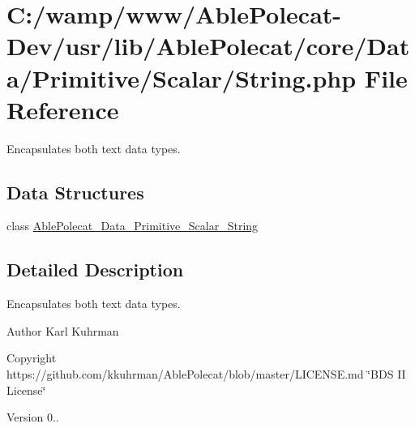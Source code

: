\hypertarget{_string_8php}{}\section{C\+:/wamp/www/\+Able\+Polecat-\/\+Dev/usr/lib/\+Able\+Polecat/core/\+Data/\+Primitive/\+Scalar/\+String.php File Reference}
\label{_string_8php}


Encapsulates both text data types.  


\subsection*{Data Structures}
\begin{DoxyCompactItemize}
\item 
class \hyperlink{class_able_polecat___data___primitive___scalar___string}{Able\+Polecat\+\_\+\+Data\+\_\+\+Primitive\+\_\+\+Scalar\+\_\+\+String}
\end{DoxyCompactItemize}


\subsection{Detailed Description}
Encapsulates both text data types. 

\begin{DoxyAuthor}{Author}
Karl Kuhrman 
\end{DoxyAuthor}
\begin{DoxyCopyright}{Copyright}
https\+://github.com/kkuhrman/\+Able\+Polecat/blob/master/\+L\+I\+C\+E\+N\+S\+E.\+md \char`\"{}\+B\+D\+S I\+I License\char`\"{} 
\end{DoxyCopyright}
\begin{DoxyVersion}{Version}
0.. 
\end{DoxyVersion}
